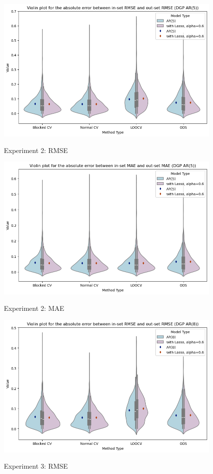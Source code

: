 \documentclass[12pt, oneside]{amsart}
\theoremstyle{definition}
\theoremstyle{remark}
\numberwithin{equation}{section}
\begin{document}
\begin{figure}[hbt!]
    \caption{Experiment 2: RMSE}
    \centering
    \includegraphics[scale=0.5]{Report/Figures/ar5_violin_rmse.jpg}
    \label{ar5_v1}
\end{figure}
\FloatBarrier

\begin{figure}[hbt!]
    \caption{Experiment 2: MAE}
    \centering
    \includegraphics[scale=0.5]{Report/Figures/ar5_violin_mae.jpg}
    \label{ar5_v2}
\end{figure}
\FloatBarrier

\begin{figure}[hbt!]
    \caption{Experiment 3: RMSE}
    \centering
    \includegraphics[scale=0.5]{Report/Figures/ar8_violin_rmse.jpg}
    \label{ar8_v1}
\end{figure}
\FloatBarrier
\end{document}

